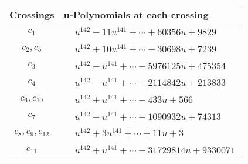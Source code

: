 \documentclass[1p]{elsarticle_modified}
\theoremstyle{definition}
\begin{document}
\begin{tabular}{m{50pt}|m{274pt}}
Crossings & \hspace{64pt}u-Polynomials at each crossing \\
\hline $$\begin{aligned}c_{1}\end{aligned}$$&$\begin{aligned}
&u^{142}-11 u^{141}+\cdots+60356 u+9829
\end{aligned}$\\
\hline $$\begin{aligned}c_{2},c_{5}\end{aligned}$$&$\begin{aligned}
&u^{142}+10 u^{141}+\cdots-30698 u+7239
\end{aligned}$\\
\hline $$\begin{aligned}c_{3}\end{aligned}$$&$\begin{aligned}
&u^{142}- u^{141}+\cdots-5976125 u+475354
\end{aligned}$\\
\hline $$\begin{aligned}c_{4}\end{aligned}$$&$\begin{aligned}
&u^{142}- u^{141}+\cdots+2114842 u+213833
\end{aligned}$\\
\hline $$\begin{aligned}c_{6},c_{10}\end{aligned}$$&$\begin{aligned}
&u^{142}+u^{141}+\cdots-433 u+566
\end{aligned}$\\
\hline $$\begin{aligned}c_{7}\end{aligned}$$&$\begin{aligned}
&u^{142}- u^{141}+\cdots-1090932 u+74313
\end{aligned}$\\
\hline $$\begin{aligned}c_{8},c_{9},c_{12}\end{aligned}$$&$\begin{aligned}
&u^{142}+3 u^{141}+\cdots+11 u+3
\end{aligned}$\\
\hline $$\begin{aligned}c_{11}\end{aligned}$$&$\begin{aligned}
&u^{142}+u^{141}+\cdots+31729814 u+9330071
\end{aligned}$\\
\hline
\end{tabular}\\~\\
\end{document}
